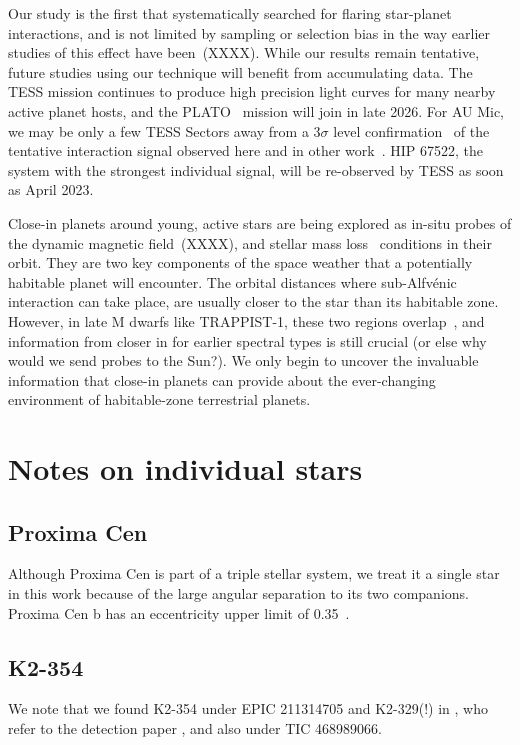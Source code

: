 \documentclass[twocolumn]{aastex631}
\begin{document}
Our study is the first that systematically searched for flaring star-planet interactions, and is not limited by sampling or selection bias in the way earlier studies of this effect have been~(XXXX). While our results remain tentative, future studies using our technique will benefit from accumulating data. The TESS mission continues to produce high precision light curves for many nearby active planet hosts, and the PLATO~\citep{rauer2014plato} mission will join in late 2026. For AU Mic, we may be only a few TESS Sectors away from a $3\sigma$ level confirmation~\citep{ilin2022searching} of the tentative interaction signal observed here and in other work~\citep{klein2022one}. HIP 67522, the system with the strongest individual signal, will be re-observed by TESS as soon as April 2023. 

Close-in planets around young, active stars are being explored as in-situ probes of the dynamic magnetic field~(XXXX), and stellar mass loss~\citep{vidotto2017exoplanets} conditions in their orbit. They are two key components of the space weather that a potentially habitable planet will encounter. The orbital distances where sub-Alfv\'enic interaction can take place, are usually closer to the star than its habitable zone. However, in late M dwarfs like TRAPPIST-1, these two regions overlap~\citep{strugarek2021physics}, and information from closer in for earlier spectral types is still crucial (or else why would we send probes to the Sun?). We only begin to uncover the invaluable information that close-in planets can provide about the ever-changing environment of habitable-zone terrestrial planets. 





\appendix
\section{Notes on individual stars}
\subsection{Proxima Cen}
Although Proxima Cen is part of a triple stellar system, we treat it a single star in this work because of the large angular separation to its two companions. Proxima Cen b has an eccentricity upper limit of 0.35~\cite{anglada-escude2016terrestrial}.


\subsection{K2-354}
We note that we found K2-354 under EPIC 211314705 and K2-329(!) in \cite{bouma2020cluster}, who refer to the detection paper \cite{pope2016transiting}, and also under TIC 468989066.
\end{document}
